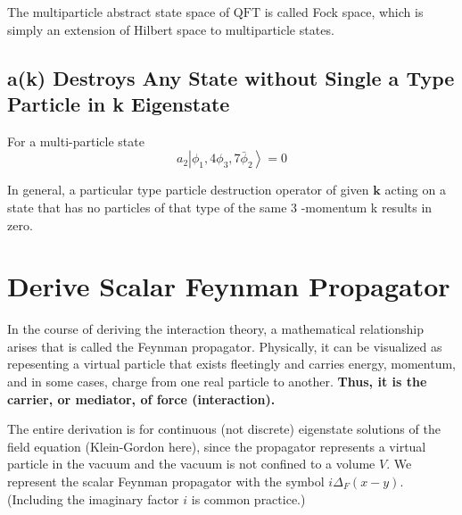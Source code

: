 The multiparticle abstract state space of $\mathrm{QFT}$ is called Fock space, which is simply an extension of Hilbert space to multiparticle states.

\subsection{a(k) Destroys Any State without Single a Type Particle in k Eigenstate}
\begin{example}
For a multi-particle state
$$
a_{2}\left|\phi_{1}, 4 \phi_{3}, 7 \bar{\phi}_{2}\right\rangle= 0
$$
\end{example}
In general, a particular type particle destruction operator of given $\mathbf{k}$ acting on a state that has no particles of that type of the same 3 -momentum k results in zero.

\section{Derive Scalar Feynman Propagator}
In the course of deriving the interaction theory, a mathematical relationship arises that is called the Feynman propagator. Physically, it can be visualized as repesenting a virtual particle that exists fleetingly and carries energy, momentum, and in some cases, charge from one real particle to another. \textbf{Thus, it is the carrier, or mediator, of force (interaction).}


The entire derivation is for continuous (not discrete) eigenstate solutions of the field equation (Klein-Gordon here), since the propagator represents a virtual particle in the vacuum and the vacuum is not confined to a volume $V$. We represent the scalar Feynman propagator with the symbol $i \Delta_{F}(x-y) .$ (Including the imaginary factor $i$ is common practice.)

